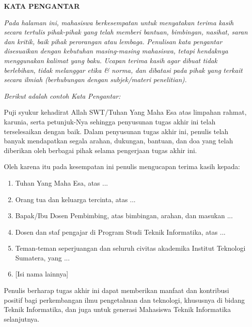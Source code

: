 \clearpage
{}%

\begin{justifying}
	\large \bfseries \centering \MakeUppercase{Kata Pengantar}\linebreak
	
	\normalsize \normalfont \justifying
	\textit{Pada halaman ini, mahasiswa berkesempatan untuk menyatakan terima kasih secara tertulis pihak-pihak yang telah memberi bantuan, bimbingan, nasihat, saran dan kritik, baik pihak perorangan atau lembaga. Penulisan kata pengantar disesuaikan dengan kebutuhan masing-masing mahasiswa, tetapi hendaknya menggunakan kalimat yang baku. Ucapan terima kasih agar dibuat tidak berlebihan, tidak melanggar etika \& norma, dan dibatasi pada pihak yang terkait secara ilmiah (berhubungan dengan subjek/materi penelitian). } \par
	\textit{Berikut adalah contoh Kata Pengantar:} \par
	Puji syukur kehadirat Allah SWT/Tuhan Yang Maha Esa atas limpahan rahmat, karunia, serta petunjuk-Nya sehingga penyusunan tugas akhir ini telah terselesaikan dengan baik. Dalam penyusunan tugas akhir ini, penulis telah banyak mendapatkan segala arahan, dukungan, bantuan, dan doa yang telah diberikan oleh berbagai pihak selama pengerjaan tugas akhir ini. \par
	Oleh karena itu pada kesempatan ini penulis mengucapan terima kasih kepada: \par
	\begin{enumerate}
		\item Tuhan Yang Maha Esa, atas ...
		\item Orang tua dan keluarga tercinta, atas ...		
		\item Bapak/Ibu Dosen Pembimbing, atas bimbingan, arahan, dan masukan ...
		\item Dosen dan staf pengajar di Program Studi Teknik Informatika, atas ...
		\item Teman-teman seperjuangan dan seluruh civitas akademika Institut Teknologi Sumatera, yang ...
		\item {[Isi nama lainnya]}
	\end{enumerate} \par
	Penulis berharap tugas akhir ini dapat memberikan manfaat dan kontribusi positif bagi perkembangan ilmu pengetahuan dan teknologi, khususnya di bidang Teknik Informatika, dan juga untuk generasi Mahasiswa Teknik Informatika selanjutnya.
	\vfill
	
\end{justifying}
\clearpage